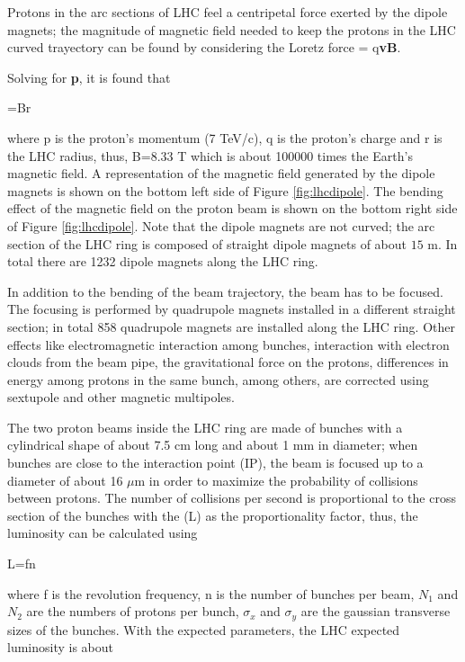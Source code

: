 Protons in the arc sections of LHC feel a centripetal force exerted by the dipole magnets; the magnitude of magnetic field needed to keep the protons in the LHC curved trayectory can be found by considering the Loretz force
\beqn
{}= q\textbf{v}\times \textbf{B}.
\eeqn

Solving for \textbf{p}, it is found that

\beqn
{}=Br 
\eeqn

\noindent where p is the proton's momentum (7 TeV/c), q is the proton's charge and r is the LHC radius, thus, B=8.33 T which is about 100000 times the Earth's magnetic field. A representation of the magnetic field generated by the dipole magnets is shown on the bottom left side of Figure \ref{fig:lhcdipole}. The bending effect of the magnetic field on the proton beam is shown on the bottom right side of Figure \ref{fig:lhcdipole}. Note that the dipole magnets are not curved; the arc section of the LHC ring is composed of straight dipole magnets of about ${15 \textrm{ m}}$. In total there are 1232 dipole magnets along the LHC ring.

In addition to the bending of the beam trajectory, the beam has to be focused. The focusing is performed by quadrupole magnets installed in a different straight section; in total 858 quadrupole magnets are installed along the LHC ring. Other effects like electromagnetic interaction among bunches, interaction with electron clouds from the beam pipe, the gravitational force on the protons, differences in energy among protons in the same bunch, among others, are corrected using sextupole and other magnetic multipoles.

The two proton beams inside the LHC ring are made of bunches with a cylindrical shape of about 7.5 cm long and about 1 mm in diameter; when bunches are close to the interaction point (IP), the beam is focused up to a diameter of about 16 $\mu$m in order to maximize the probability of collisions between protons. The number of collisions per second is proportional to the cross section of the bunches with the  (L) as the proportionality factor, thus, the luminosity can be calculated using

\beqn
L=fn\label{eq:lumi}
\eeqn

\noindent where f is the revolution frequency, n is the number of bunches per beam, $N_1$ and $N_2$ are the numbers of protons per bunch, $\sigma_x$ and $\sigma_y$ are the gaussian transverse sizes of the bunches. With the expected parameters, the LHC expected luminosity is about  

